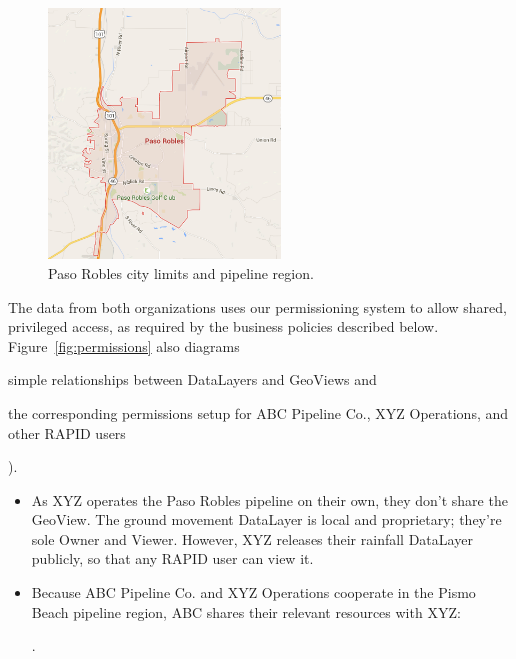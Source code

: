 \begin{figure}
    \centering
    \includegraphics[width=0.55\textwidth]{figures/paso.png}
    \caption{Paso Robles city limits and pipeline region.}
    \label{fig:paso}
\end{figure}

The data from both organizations uses our permissioning system to allow shared, privileged access, as required by the business policies described below. Figure~\ref{fig:permissions} also diagrams  
\begin{enumerate*}[label=\itshape\alph*\upshape)]
\item simple relationships between DataLayers and GeoViews and
\item the corresponding permissions setup for ABC Pipeline Co., XYZ Operations, and other RAPID users
\end{enumerate*}).

\begin{itemize}
\item As XYZ operates the Paso Robles pipeline on their own, they don't share the GeoView. The ground movement DataLayer is local and proprietary; they're sole Owner and Viewer. However, XYZ releases their rainfall DataLayer publicly, so that any RAPID user can view it.
\item Because ABC Pipeline Co. and XYZ Operations cooperate in the Pismo Beach pipeline region, ABC shares their relevant resources with XYZ: .
\end{itemize}
 

